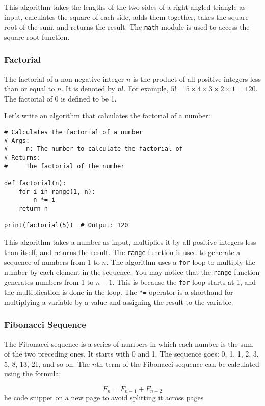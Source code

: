 This algorithm takes the lengths of the two sides of a right-angled triangle as input, calculates the square of each side, adds them together, takes the square root of the sum, and returns the result. The \texttt{math} module is used to access the square root function.

\subsubsection{Factorial}

The factorial of a non-negative integer $n$ is the product of all positive integers less than or equal to $n$. It is denoted by $n!$. For example, $5! = 5 \times 4 \times 3 \times 2 \times 1 = 120$. The factorial of 0 is defined to be 1.

Let's write an algorithm that calculates the factorial of a number:

\begin{lstlisting}
# Calculates the factorial of a number
# Args:
#     n: The number to calculate the factorial of
# Returns:
#     The factorial of the number

def factorial(n):
    for i in range(1, n):
        n *= i
    return n

print(factorial(5))  # Output: 120
\end{lstlisting}

This algorithm takes a number as input, multiplies it by all positive integers less than itself, and returns the result. The \texttt{range} function is used to generate a sequence of numbers from 1 to $n$. The algorithm uses a \texttt{for} loop to multiply the number by each element in the sequence. You may notice that the \texttt{range} function generates numbers from 1 to $n-1$. This is because the \texttt{for} loop starts at 1, and the multiplication is done in the loop. The \texttt{*=} operator is a shorthand for multiplying a variable by a value and assigning the result to the variable.

\subsubsection{Fibonacci Sequence}

The Fibonacci sequence is a series of numbers in which each number is the sum of the two preceding ones. It starts with 0 and 1. The sequence goes: 0, 1, 1, 2, 3, 5, 8, 13, 21, and so on. The $n$th term of the Fibonacci sequence can be calculated using the formula:

\begin{equation}
    F_n = F_{n-1} + F_{n-2}
\end{equation}
\newpage %
he code snippet on a new page to avoid splitting it across pages

